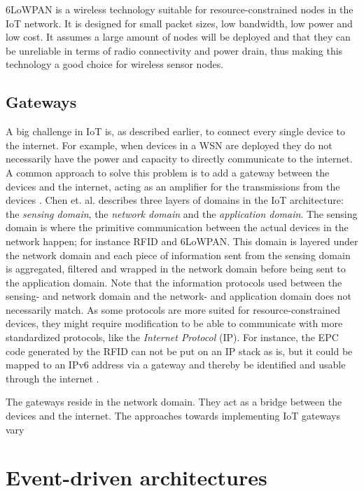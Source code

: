 6LoWPAN is a wireless technology suitable for resource-constrained nodes in the
IoT network. It is designed for small packet sizes, low bandwidth, low power
and low cost. It assumes a large amount of nodes will be deployed and that they
can be unreliable in terms of radio connectivity and power drain, thus making
this technology a good choice for wireless sensor nodes. \cite{kushalnagar2007ipv6}

\subsection{Gateways}

A big challenge in IoT is, as described earlier, to connect every single device
to the internet. For example, when devices in a WSN are deployed they do not
necessarily have the power and capacity to directly communicate to the
internet. A common approach to solve this problem is to add a gateway between
the devices and the internet, acting as an amplifier for the transmissions from
the devices \cite{zhu2010iot}. Chen et. al. \cite{chen2011brief} describes
three layers of domains in the IoT architecture: the \textit{sensing domain},
the \textit{network domain} and the \textit{application domain}. The sensing
domain is where the primitive communication between the actual devices in the
network happen; for instance RFID and 6LoWPAN. This domain is layered under the
network domain and each piece of information sent from the sensing domain is
aggregated, filtered and wrapped in the network domain before being sent to the
application domain. Note that the information protocols used between the
sensing- and network domain and the network- and application domain does not
necessarily match. As some protocols are more suited for resource-constrained
devices, they might require modification to be able to communicate with more
standardized protocols, like the \textit{Internet Protocol} (IP). For instance,
the EPC code generated by the RFID can not be put on an IP stack as is, but it
could be mapped to an IPv6 address via a gateway and thereby be identified and
usable through the internet \cite{lee2007epc}.

The gateways reside in the network domain. They act as a bridge between the
devices and the internet. The approaches towards implementing IoT gateways vary

\section{Event-driven architectures}

